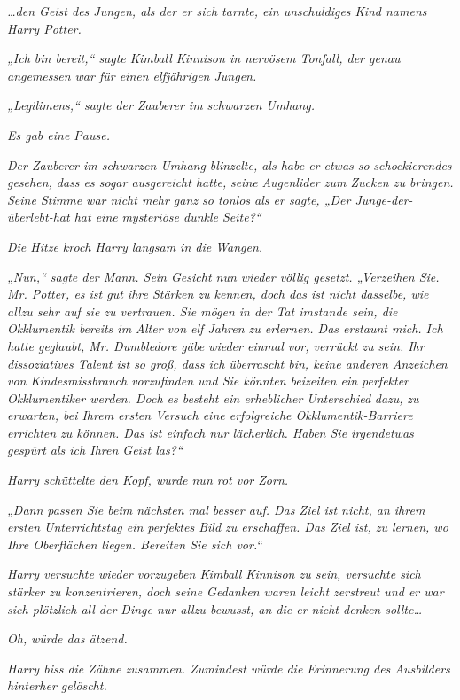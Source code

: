 {\emph{…den Geist des Jungen, als der er sich tarnte, ein unschuldiges Kind namens Harry Potter.}

\emph{„Ich bin bereit,“ sagte Kimball Kinnison in nervösem Tonfall, der genau angemessen war für einen elfjährigen Jungen.}

\emph{„\emph{Legilimens,}“ sagte der Zauberer im schwarzen Umhang.}

\emph{Es gab eine Pause.}

\emph{Der Zauberer im schwarzen Umhang blinzelte, als habe er etwas so} \emph{schockierendes gesehen, dass es sogar ausgereicht hatte,} \emph{\emph{seine}} \emph{Augenlider zum Zucken zu bringen. Seine Stimme war nicht mehr ganz so tonlos als er sagte, „Der Junge-der-überlebt-hat hat eine} \emph{\emph{mysteriöse dunkle Seite?}“}

\emph{Die Hitze kroch Harry langsam in die Wangen.}

\emph{„Nun,“ sagte der Mann. Sein Gesicht nun wieder völlig gesetzt. „Verzeihen Sie. Mr. Potter, es ist gut ihre Stärken zu kennen, doch das ist nicht dasselbe, wie} \emph{allzu sehr auf sie zu vertrauen. Sie mögen in der Tat imstande sein, die Okklumentik bereits im Alter von elf Jahren zu erlernen. Das erstaunt mich. Ich hatte geglaubt, Mr. Dumbledore gäbe wieder einmal vor, verrückt zu sein. Ihr dissoziatives Talent ist so groß, dass ich überrascht bin, keine anderen Anzeichen von Kindesmissbrauch vorzufinden und Sie könnten beizeiten ein perfekter Okklumentiker werden. Doch es besteht ein erheblicher Unterschied} \emph{dazu,} \emph{zu erwarten, bei Ihrem ersten Versuch eine erfolgreiche Okklumentik-Barriere errichten zu können. Das ist einfach nur lächerlich. Haben Sie irgendetwas gespürt als ich Ihren Geist las?“}

\emph{Harry schüttelte den Kopf, wurde nun rot vor Zorn.}

\emph{„Dann passen Sie beim nächsten mal besser auf. Das Ziel ist nicht, an ihrem ersten Unterrichtstag ein perfektes Bild zu erschaffen. Das Ziel ist, zu lernen, wo Ihre Oberflächen liegen. Bereiten Sie sich vor.“}

\emph{Harry versuchte wieder vorzugeben Kimball Kinnison zu sein, versuchte sich stärker zu konzentrieren, doch seine Gedanken waren leicht zerstreut und er war sich plötzlich all der Dinge nur allzu bewusst, an die er nicht denken sollte…}

\emph{Oh,} \emph{würde das ätzend.}

\emph{Harry biss die Zähne zusammen. Zumindest würde die Erinnerung des Ausbilders hinterher gelöscht.}

}
